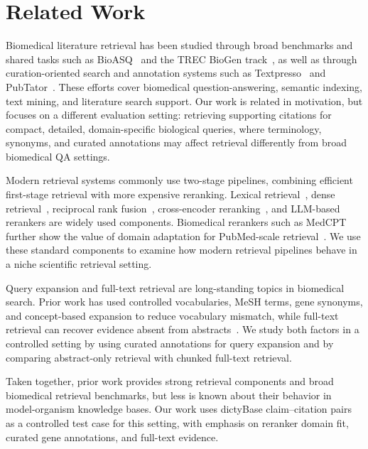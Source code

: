 \documentclass[runningheads]{llncs}
\begin{document}
\section{Related Work}
Biomedical literature retrieval has been studied through broad benchmarks and shared tasks such as BioASQ~\cite{tsatsaronis_overview_2015} and the TREC BioGen track~\cite{coordinators-trec2025-papers-proc-4}, as well as through curation-oriented search and annotation systems such as Textpresso~\cite{muller_textpresso_2004} and PubTator~\cite{wei_pubtator_2013}. These efforts cover biomedical question-answering, semantic indexing, text mining, and literature search support. Our work is related in motivation, but focuses on a different evaluation setting: retrieving supporting citations for compact, detailed, domain-specific biological queries, where terminology, synonyms, and curated annotations may affect retrieval differently from broad biomedical QA settings.

Modern retrieval systems commonly use two-stage pipelines, combining efficient first-stage retrieval with more expensive reranking. Lexical retrieval~\cite{robertson_probabilistic_2009}, dense retrieval~\cite{li_making_2023}, reciprocal rank fusion~\cite{cormack_reciprocal_2009}, cross-encoder reranking~\cite{bajaj_ms_2018}, and LLM-based rerankers are widely used components.
Biomedical rerankers such as MedCPT further show the value of domain adaptation for PubMed-scale retrieval~\cite{jin_medcpt_2023}. We use these standard components to examine how modern retrieval pipelines behave in a niche scientific retrieval setting.

Query expansion and full-text retrieval are long-standing topics in biomedical search. Prior work has used controlled vocabularies, MeSH terms, gene synonyms, and concept-based expansion to reduce vocabulary mismatch, while full-text retrieval can recover evidence absent from abstracts~\cite{lu_evaluation_2009,lu_empirical_2009,kim_towards_2022}. We study both factors in a controlled setting by using curated annotations for query expansion and by comparing abstract-only retrieval with chunked full-text retrieval.

Taken together, prior work provides strong retrieval components and broad
biomedical retrieval benchmarks, but less is known about their behavior in model-organism knowledge bases. Our work uses dictyBase
claim--citation pairs as a controlled test case for this setting, with emphasis on
reranker domain fit, curated gene annotations, and full-text evidence.
\end{document}
